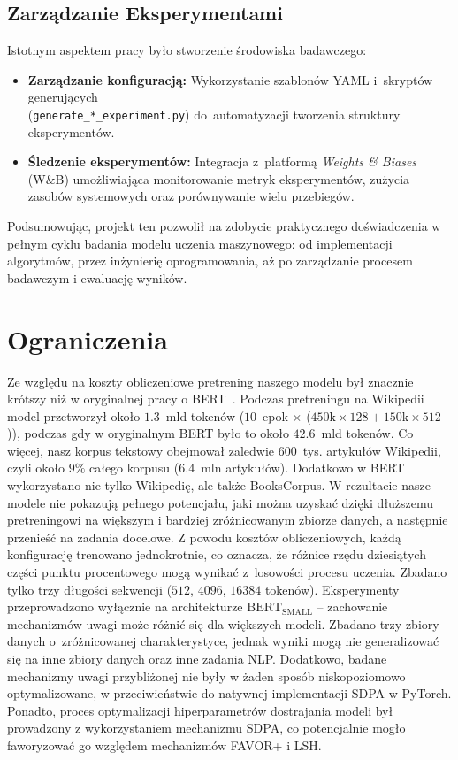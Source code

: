 \documentclass[a4paper,11pt,twoside]{report}
\theoremstyle{definition}
\begin{document}
\subsection{Zarządzanie Eksperymentami}

Istotnym aspektem pracy było stworzenie środowiska badawczego:
\begin{itemize}
    \item \textbf{Zarządzanie konfiguracją:} Wykorzystanie szablonów YAML i~skryptów generujących \\(\texttt{generate\_*\_experiment.py}) do~automatyzacji tworzenia struktury eksperymentów.
    \item \textbf{Śledzenie eksperymentów:} Integracja z~platformą \textit{Weights \& Biases} (W\&B) umożliwiająca monitorowanie metryk eksperymentów, zużycia zasobów systemowych oraz porównywanie wielu przebiegów.
\end{itemize}


Podsumowując, projekt ten pozwolił na zdobycie praktycznego doświadczenia w pełnym cyklu badania modelu uczenia maszynowego: od implementacji algorytmów, przez inżynierię oprogramowania, aż po zarządzanie procesem badawczym i ewaluację wyników.


\section{Ograniczenia}

Ze względu na koszty obliczeniowe pretrening naszego modelu był znacznie krótszy niż w oryginalnej pracy o BERT~\cite{devlin2019bert}. Podczas pretreningu na Wikipedii model przetworzył około $1.3$~mld tokenów ($10$~epok $\times$ ($450\text{k} \times 128 + 150\text{k} \times 512$)), podczas gdy w oryginalnym BERT było to około $42.6$~mld tokenów. Co więcej, nasz korpus tekstowy obejmował zaledwie $600$~tys. artykułów Wikipedii, czyli  około $9\%$ całego korpusu ($6.4$~mln artykułów). Dodatkowo w BERT wykorzystano nie tylko Wikipedię, ale także BooksCorpus. W rezultacie nasze modele nie pokazują pełnego potencjału, jaki można uzyskać dzięki dłuższemu pretreningowi na większym i bardziej zróżnicowanym zbiorze danych, a następnie przenieść na zadania docelowe.
Z powodu kosztów obliczeniowych, każdą konfigurację trenowano jednokrotnie, co oznacza, że różnice rzędu dziesiątych części punktu procentowego mogą wynikać z~losowości procesu uczenia. Zbadano tylko trzy długości sekwencji ($512$, $4096$, $16384$ tokenów). Eksperymenty przeprowadzono wyłącznie na architekturze $\text{BERT}_{\text{SMALL}}$ -- zachowanie mechanizmów uwagi może różnić się dla większych modeli. Zbadano trzy zbiory danych o~zróżnicowanej charakterystyce, jednak wyniki mogą nie generalizować się na inne zbiory danych oraz inne zadania NLP. Dodatkowo, badane mechanizmy uwagi przybliżonej nie były w żaden sposób niskopoziomowo optymalizowane, w przeciwieństwie do natywnej implementacji SDPA w PyTorch. Ponadto, proces optymalizacji hiperparametrów dostrajania modeli był prowadzony z wykorzystaniem mechanizmu SDPA, co potencjalnie mogło faworyzować go względem mechanizmów FAVOR+ i LSH.
\end{document}
